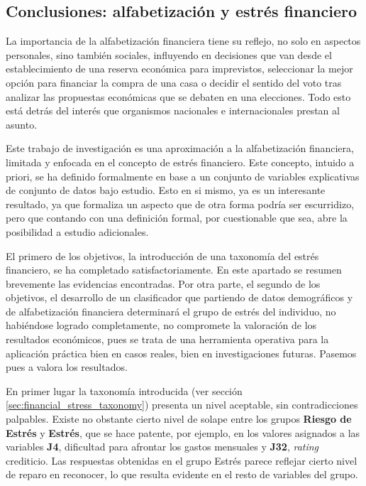 \documentclass[a4paper, 11pt]{article}
\begin{document}
\subsection{Conclusiones: alfabetización y estrés financiero}
\label{sec:sub:conclusions_financial_stress}
La importancia de la alfabetización financiera tiene su reflejo, no solo en 
aspectos personales, sino también sociales, influyendo en decisiones que van desde
el establecimiento de una reserva económica para imprevistos, seleccionar la mejor
opción para financiar la compra de una casa o decidir el sentido del voto tras 
analizar las propuestas económicas que se debaten en una elecciones. 
Todo esto está detrás del interés que organismos nacionales e internacionales 
prestan al asunto. 

Este trabajo de investigación es una aproximación a la alfabetización financiera,
limitada y enfocada en el concepto de estrés financiero. Este concepto, intuido 
a priori, se ha definido formalmente en base a un conjunto de variables explicativas
de conjunto de datos bajo estudio. Esto en si mismo, ya es un interesante resultado, 
ya que formaliza un aspecto que de otra forma podría ser escurridizo, pero que 
contando con una definición formal, por cuestionable que sea, abre la posibilidad 
a estudio adicionales.

El primero de los objetivos, la introducción de una taxonomía del estrés financiero, se
ha completado satisfactoriamente. En este apartado se resumen brevemente las evidencias
encontradas. Por otra parte, el segundo de los objetivos, el desarrollo de un clasificador
que partiendo de datos demográficos y de alfabetización financiera determinará el grupo
de estrés del individuo, no habiéndose logrado completamente, no compromete la valoración
de los resultados económicos, pues se trata de una herramienta operativa para la aplicación
práctica bien en casos reales, bien en investigaciones futuras. Pasemos pues a valora 
los resultados.

En primer lugar la taxonomía introducida (ver sección \ref{sec:financial_stress_taxonomy})
presenta un nivel aceptable, sin contradicciones palpables. Existe no obstante cierto nivel
de solape entre los grupos \textbf{Riesgo de Estrés} y \textbf{Estrés}, que se hace patente,
por ejemplo, en los valores asignados a las variables \textbf{J4}, dificultad para afrontar
los gastos mensuales y \textbf{J32}, \textit{rating} crediticio. Las respuestas obtenidas
en el grupo Estrés parece reflejar cierto nivel de reparo en reconocer, lo que resulta
evidente en el resto de variables del grupo.
\end{document}
